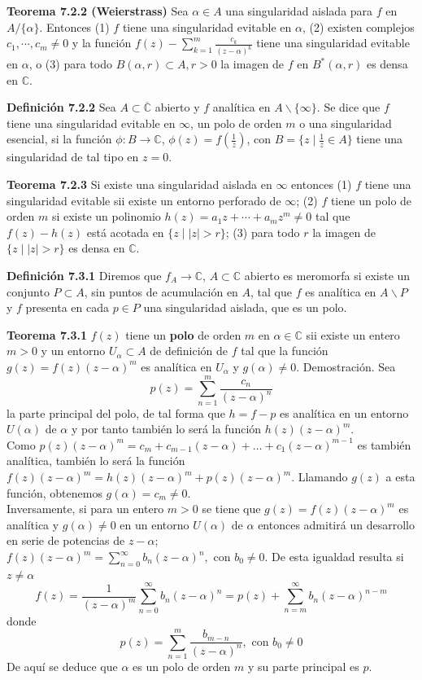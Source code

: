 \documentclass[a4paper, 11pt]{extarticle}
\newcommand{\tma}[1]{\textcolor{rojo}{\textbf{Teorema #1}}}
\newcommand{\defi}[1]{\textcolor{azul}{\textbf{Definición #1}}}
\newcommand{\dem}[1]{\textcolor{gris}{\small{Demostración. #1}}}
\begin{document}
\begin{multicols*}{2}
\tma{7.2.2 (Weierstrass)} Sea \(\alpha \in A\) una singularidad aislada para
\(f\) en \(A / \{ \alpha \}\). Entonces (1) \(f\) tiene una singularidad
evitable en \(\alpha\), (2) existen complejos \(c_1, \cdots, c_m \neq 0\) 
y la función \(f(z) - \sum _{k=1}^{m} \frac{c_k}{(z-\alpha)^k}\) tiene una
singularidad evitable en \(\alpha\), o (3) para todo \(B(\alpha, r) \subset A, r > 0\)
la imagen de \(f\) en \(B^*(\alpha, r)\) es densa en \(\mathbb{C}\).

\defi{7.2.2} Sea \(A \subset \overline{\mathbb{C}}\) abierto y \(f\)
analítica en \(A \backslash \{ \infty \}\). Se dice que \(f\) tiene una
singularidad evitable en \(\infty\), un polo de orden \(m\) o una
singularidad esencial, si la función \(\phi: B \rightarrow  \mathbb{C}\), \(\phi(z) = f(\frac{1}{z})\), con \(B = \{ z \;|\; \frac{1}{z} \in A \}\) tiene
una singularidad de tal tipo en \(z = 0\).

\tma{7.2.3} Si existe una singularidad aislada en \(\infty\) entonces (1) \(f\) tiene una singularidad evitable sii existe un entorno perforado de \(\infty\); (2) \(f\) tiene un polo de orden \(m\) si existe un polinomio \(h(z) = a_1z + \cdots + a_mz^m \neq 0\) tal que \(f(z) - h(z)\) está acotada
en \(\{ z \;|\; |z| > r \}\); (3) para todo \(r\) la imagen de \(\{ z
\;|\; |z| > r \}\) es densa en \(\mathbb{C}\).


\defi{7.3.1} Diremos que \(f_ A \rightarrow  \mathbb{C}\), \(A \subset
\mathbb{C}\) abierto es meromorfa si existe un conjunto \(P \subset A\), sin
puntos de acumulación en \(A\), tal que \(f\) es analítica en \(A
\backslash P\) y \(f\) presenta en cada \(p \in P\) una singularidad
aislada, que es un polo.

\tma{7.3.1} \(f(z)\) tiene un \textbf{polo} de orden \(m\) en \(\alpha \in \mathbb{C}\) sii existe
un entero \(m > 0\) y un entorno \(U_\alpha 
\subset A\) de definición de \(f\) tal que la función \(g(z) = f(z)(z -
\alpha)^m\) es analítica en \(U_\alpha\) y \(g(\alpha) \neq 0\). 
\dem{ Sea
$$
p(z)=\sum_{n=1}^{m} \frac{c_{n}}{(z-\alpha)^{n}}
$$
la parte principal del polo, de tal forma que $h=f-p$
es analítica en un entorno $U(\alpha)$ de $\alpha$ y por tanto también lo será la función
$h(z)(z-\alpha)^{m}$. \\Como
$p(z)(z-\alpha)^{m}=c_{m}+c_{m-1}(z-\alpha)+\ldots+c_{1}(z-\alpha)^{m-1}$
es también analítica, también lo será la función
$f(z)(z-\alpha)^{m}=h(z)(z-\alpha)^{m}+p(z)(z-\alpha)^{m}$.
Llamando $g(z)$ a esta función, obtenemos
$g(\alpha)=c_{m} \neq 0$.\\
Inversamente, si para un entero $m>0$ se tiene que $g(z)=f(z)(z-\alpha)^{m}$ 
es analítica y $g(\alpha) \neq 0$ en un entorno $U(\alpha)$ de $\alpha$ entonces admitirá 
un desarrollo en serie de potencias de $z-\alpha$;
$f(z)(z-\alpha)^{m}=\sum_{n=0}^{\infty} b_{n}(z-\alpha)^{n}, \text { con } b_{0} \neq 0$.
De esta igualdad resulta si $z \neq \alpha$
$$
f(z) =\frac{1}{(z-\alpha)^{m}} \sum_{n=0}^{\infty} b_{n}(z-\alpha)^{n}
=p(z)+\sum_{n=m}^{\infty} b_{n}(z-\alpha)^{n-m}
$$
donde
$$
p(z)=\sum_{n=1}^{m} \frac{b_{m-n}}{(z-\alpha)^{n}}, \text { con } b_{0} \neq 0
$$
De aquí se deduce que $\alpha$ es un polo de orden $m$ y su parte principal es $p$.}


\end{multicols*}
\end{document}

